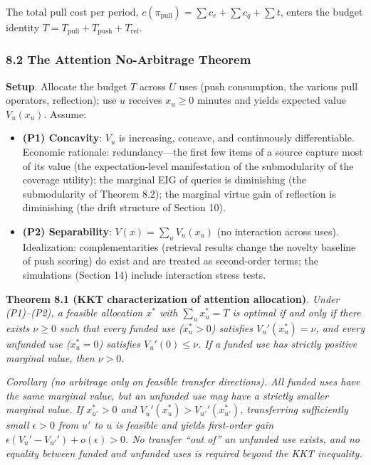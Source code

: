 \documentclass[
  11pt]{article}
\providecommand{\tightlist}{%
  \setlength{\itemsep}{0pt}\setlength{\parskip}{0pt}}
\begin{document}
The total pull cost per period,
\(c(\pi_{\mathrm{pull}}) = \sum c_e + \sum c_q + \sum t\), enters the
budget identity
\(T = T_{\mathrm{pull}} + T_{\mathrm{push}} + T_{\mathrm{ref}}\).

\subsubsection{8.2 The Attention No-Arbitrage
Theorem}\label{the-attention-no-arbitrage-theorem}

\textbf{Setup}. Allocate the budget \(T\) across \(U\) uses (push
consumption, the various pull operators, reflection); use \(u\) receives
\(x_u \ge 0\) minutes and yields expected value \(V_u(x_u)\). Assume:

\begin{itemize}
\tightlist
\item
  \textbf{(P1) Concavity}: \(V_u\) is increasing, concave, and
  continuously differentiable. Economic rationale: redundancy---the
  first few items of a source capture most of its value (the
  expectation-level manifestation of the submodularity of the coverage
  utility); the marginal EIG of queries is diminishing (the
  submodularity of Theorem 8.2); the marginal virtue gain of reflection
  is diminishing (the drift structure of Section 10).
\item
  \textbf{(P2) Separability}: \(V(x) = \sum_u V_u(x_u)\) (no interaction
  across uses). Idealization: complementarities (retrieval results
  change the novelty baseline of push scoring) do exist and are treated
  as second-order terms; the simulations (Section 14) include
  interaction stress tests.
\end{itemize}

\textbf{Theorem 8.1 (KKT characterization of attention allocation)}.
\emph{Under (P1)--(P2), a feasible allocation \(x^*\) with
\(\sum_ux_u^*=T\) is optimal if and only if there exists \(\nu\ge0\)
such that every funded use (\(x_u^*>0\)) satisfies \(V_u'(x_u^*)=\nu\),
and every unfunded use (\(x_u^*=0\)) satisfies \(V_u'(0)\le\nu\). If a
funded use has strictly positive marginal value, then \(\nu>0\).}

\emph{Corollary (no arbitrage only on feasible transfer directions). All
funded uses have the same marginal value, but an unfunded use may have a
strictly smaller marginal value. If \(x_{u'}^*>0\) and
\(V_u'(x_u^*)>V_{u'}'(x_{u'}^*)\), transferring sufficiently small
\(\epsilon>0\) from \(u'\) to \(u\) is feasible and yields first-order
gain \(\epsilon(V_u'-V_{u'}')+o(\epsilon)>0\). No transfer ``out of'' an
unfunded use exists, and no equality between funded and unfunded uses is
required beyond the KKT inequality.}
\end{document}
